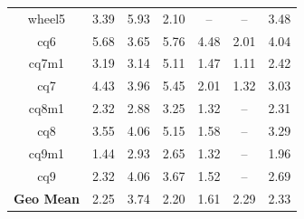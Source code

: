 \begin{table}
{\begin{tabular}{c|ccccc|c}
            wheel5            & 3.39               & 5.93                 & 2.10                 & --                 & --                  & 3.48              \\
            cq6               & 5.68               & 3.65                 & 5.76                 & 4.48               & 2.01                & 4.04              \\
            cq7m1             & 3.19               & 3.14                 & 5.11                 & 1.47               & 1.11                & 2.42              \\
            cq7               & 4.43               & 3.96                 & 5.45                 & 2.01               & 1.32                & 3.03              \\
            cq8m1             & 2.32               & 2.88                 & 3.25                 & 1.32               & --                  & 2.31              \\
            cq8               & 3.55               & 4.06                 & 5.15                 & 1.58               & --                  & 3.29              \\
            cq9m1             & 1.44               & 2.93                 & 2.65                 & 1.32               & --                  & 1.96              \\
            cq9               & 2.32               & 4.06                 & 3.67                 & 1.52               & --                  & 2.69              \\
            \hline
            \textbf{Geo Mean} & 2.25               & 3.74                 & 2.20                 & 1.61               & 2.29                & 2.33
        \end{tabular}%
    }
    \label{tab:speedups}
\end{table}

